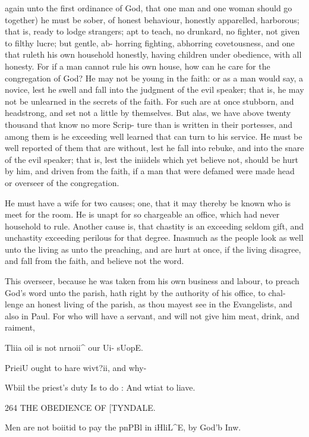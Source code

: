 \documentclass{custom}
\begin{document}
{again unto the first ordinance of God, that one man and 
one woman should go together) he must be sober, of 
honest behaviour, honestly apparelled, harborous; that is, 
ready to lodge strangers; apt to teach, no drunkard, 
no fighter, not given to filthy lucre; but gentle, ab- 
horring fighting, abhorring covetousness, and one that 
ruleth his own household honestly, having children under 
obedience, with all honesty. For if a man cannot rule his 
own house, how can he care for the congregation of God? 
He may not be young in the faith: or as a man would 
say, a novice, lest he swell and fall into the judgment of 
the evil speaker; that is, he may not be unlearned in the 
secrets of the faith. For such are at once stubborn, and 
headstrong, and set not a little by themselves. But alas, 
we have above twenty thousand that know no more Scrip- 
ture than is written in their portesses, and among them is 
he exceeding well learned that can turn to his service. 
He must be well reported of them that are without, lest 
he fall into rebuke, and into the snare of the evil speaker; 
that is, lest the iniidels which yet believe not, should be 
hurt by him, and driven from the faith, if a man that were 
defamed were made head or overseer of the congregation. 

He must have a wife for two causes; one, that it may 
thereby be known who is meet for the room. He is unapt 
for so chargeable an office, which had never household to 
rule. Another cause is, that chastity is an exceeding 
seldom gift, and unchastity exceeding perilous for that 
degree. Inasmuch as the people look as well unto the 
living as unto the preaching, and are hurt at once, if the 
living disagree, and fall from the faith, and believe not 
the word. 

This overseer, because he was taken from his own 
business and labour, to preach God's word unto the 
parish, hath right by the authority of his office, to chal- 
lenge an honest living of the parish, as thou mayest see 
in the Evangelists, and also in Paul. For who will have 
a servant, and will not give him meat, drink, and raiment, 

Tliia oil is 
not nrnoii^ 
our Ui- 
sUopE. 

PrieiU 
ought to 
hare wivt?ii, 
and why- 

Wbiil tbe 
priest's 
duty Is to 
do : And 
wtiat to 
liave. 


264
THE OBEDIENCE OF
[TYNDALE.

Men are 
not boiitid 
to pay the 
pnPBl in 
iHliL^E, by 
God'b Inw. 

}
\end{document}
